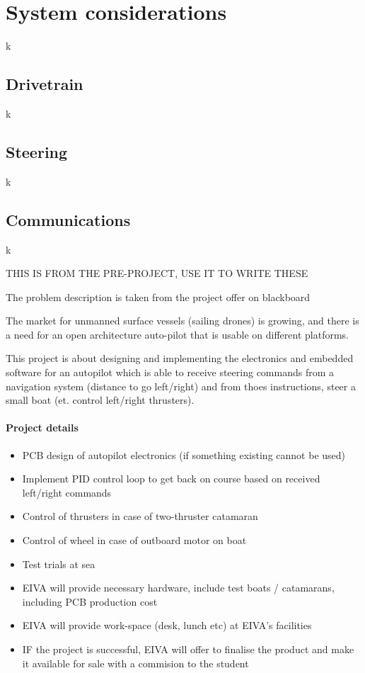 \section{System considerations}
k

\subsection{Drivetrain}

k

\subsection{Steering}
k

\subsection{Communications}
k

THIS IS FROM THE PRE-PROJECT, USE IT TO WRITE THESE

The problem description is taken from the project offer on blackboard\cite{EIVA-description}

The market for unmanned surface vessels (sailing drones) is growing, and there is a need for an open architecture auto-pilot that is usable on different platforms.

This project is about designing and implementing the electronics and embedded software for an autopilot which is able to receive steering commands from a navigation system (distance to go left/right) and from thoes instructions, steer a small boat (et. control left/right thrusters).


\paragraph{Project details}
\begin{itemize}
\item PCB design of autopilot electronics (if something existing cannot be used)
\item Implement PID control loop to get back on course based on received left/right commands
\item Control of thrusters in case of two-thruster catamaran
\item Control of wheel in case of outboard motor on boat
\item Test trials at sea
\item EIVA will provide necessary hardware, include test boats / catamarans, including PCB production cost
\item EIVA will provide work-space (desk, lunch etc) at EIVA's facilities
\item IF the project is successful, EIVA will offer to finalise the product and make it available for sale with a commision to the student
\end{itemize}